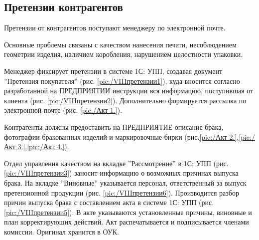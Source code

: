  \newpage
\subsection{Претензии контрагентов}
\label{BP_CLaim} 

Претензии от контрагентов поступают менеджеру по электронной почте. 

Основные проблемы связаны с качеством нанесения печати, несоблюдением геометрии изделия, наличием коробления, нарушением целостности упаковки. 

Менеджер фиксирует претензии в системе 1С: УПП, создавая документ ''Претензия покупателя'' (рис. \ref{pic:/VIIIпретензии1}), куда вносится согласно разработанной на ПРЕДПРИЯТИИ инструкции вся информацию, поступившая от клиента (рис. \ref{pic:/VIIIпретензии2}). Дополнительно формируется рассылка по электронной почте (рис. \ref{pic:/Акт 1.}).

Контрагенты должны предоставить на ПРЕДПРИЯТИЕ описание брака, фотографии бракованных изделий и маркировочные бирки (рис.\ref{pic:/Акт 2.},\ref{pic:/Акт 3.},\ref{pic:/Акт 4.}).

Отдел управления качеством на вкладке ''Рассмотрение'' в 1С: УПП (рис. \ref{pic:/VIIIпретензии3}) заносит информацию о возможных причинах выпуска брака. На вкладке ''Виновные'' указывается персонал, ответственный за выпуск претензионной продукции (рис. \ref{pic:/VIIIпретензии6}). Производится разбор причин выпуска брака с составлением акта в системе 1С: УПП (рис. \ref{pic:/VIIIпретензии5}). В акте указываются установленные причины, виновные и план корректирующих действий. Акт распечатывается и подписывается членами комиссии. Оригинал хранится в ОУК.  




 \newpage

